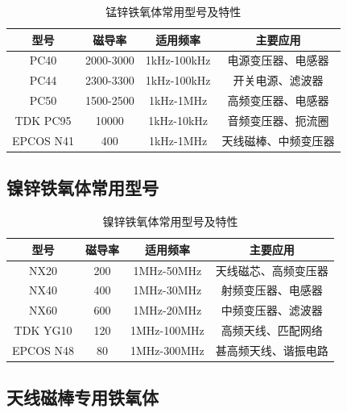 \documentclass[12pt,UTF8]{ctexbook}
\begin{document}
\begin{table}[H]
    \centering
    \begin{tabular}{|c|c|c|c|}
        \hline
        \textbf{型号} & \textbf{磁导率} & \textbf{适用频率} & \textbf{主要应用} \\
        \hline
        PC40 & 2000-3000 & 1kHz-100kHz & 电源变压器、电感器 \\
        \hline
        PC44 & 2300-3300 & 1kHz-100kHz & 开关电源、滤波器 \\
        \hline
        PC50 & 1500-2500 & 1kHz-1MHz & 高频变压器、电感器 \\
        \hline
        TDK PC95 & 10000 & 1kHz-10kHz & 音频变压器、扼流圈 \\
        \hline
        EPCOS N41 & 400 & 1kHz-1MHz & 天线磁棒、中频变压器 \\
        \hline
    \end{tabular}
    \caption{锰锌铁氧体常用型号及特性}
    \label{tab:mnzn_ferrite}
\end{table}

\subsection{镍锌铁氧体常用型号}

\begin{table}[H]
    \centering
    \begin{tabular}{|c|c|c|c|}
        \hline
        \textbf{型号} & \textbf{磁导率} & \textbf{适用频率} & \textbf{主要应用} \\
        \hline
        NX20 & 200 & 1MHz-50MHz & 天线磁芯、高频变压器 \\
        \hline
        NX40 & 400 & 1MHz-30MHz & 射频变压器、电感器 \\
        \hline
        NX60 & 600 & 1MHz-20MHz & 中频变压器、滤波器 \\
        \hline
        TDK YG10 & 120 & 1MHz-100MHz & 高频天线、匹配网络 \\
        \hline
        EPCOS N48 & 80 & 1MHz-300MHz & 甚高频天线、谐振电路 \\
        \hline
    \end{tabular}
    \caption{镍锌铁氧体常用型号及特性}
    \label{tab:nizn_ferrite}
\end{table}

\subsection{天线磁棒专用铁氧体}
\end{document}
